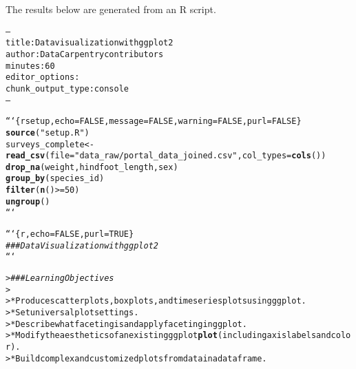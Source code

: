 \documentclass{article}\usepackage[]{graphicx}\usepackage[]{xcolor}
\makeatletter
\newcommand{\hlstr}[1]{\textcolor[rgb]{0.192,0.494,0.8}{#1}}%
\newcommand{\hlcom}[1]{\textcolor[rgb]{0.678,0.584,0.686}{\textit{#1}}}%
\newcommand{\hlkwd}[1]{\textcolor[rgb]{0.737,0.353,0.396}{\textbf{#1}}}%
\newenvironment{kframe}{%
 \def\at@end@of@kframe{}%
 \ifinner\ifhmode%
  \def\at@end@of@kframe{\end{minipage}}%
  \begin{minipage}{\columnwidth}%
 \fi\fi%
 \def\FrameCommand##1{\hskip\@totalleftmargin \hskip-\fboxsep
 \colorbox{shadecolor}{##1}\hskip-\fboxsep
     \hskip-\linewidth \hskip-\@totalleftmargin \hskip\columnwidth}%
 \MakeFramed {\advance\hsize-\width
   \@totalleftmargin\z@ \linewidth\hsize
   \@setminipage}}%
 {\par\unskip\endMakeFramed%
 \at@end@of@kframe}
\newenvironment{knitrout}{}{} %
\makeatother
\begin{document}
\title{\title{\title{\title{\title{}}}}}



\maketitle
The results below are generated from an R script.

\begin{knitrout}
\color{fgcolor}\begin{kframe}
\begin{alltt}
---
title: Data visualization with ggplot2
author: Data Carpentry contributors
minutes: 60
editor_options:
  chunk_output_type: console
---


```\{r setup, echo=FALSE, message = FALSE, warning = FALSE, purl=FALSE\}
\hlkwd{source}(\hlstr{"setup.R"})
surveys_complete <- \hlkwd{read_csv}(file = \hlstr{"data_raw/portal_data_joined.csv"}, col_types = \hlkwd{cols}()) %>%
  \hlkwd{drop_na}(weight, hindfoot_length, sex) %>%
  \hlkwd{group_by}(species_id) %>%
  \hlkwd{filter}(\hlkwd{n}() >= 50) %>%
  \hlkwd{ungroup}()
```

```\{r, echo=FALSE, purl=TRUE\}
\hlcom{### Data Visualization with ggplot2}
```
\end{alltt}


{\ttfamily\noindent\bfseries{}}\end{kframe}
\end{knitrout}
\begin{knitrout}
\color{fgcolor}\begin{kframe}
\begin{alltt}

> \hlcom{### Learning Objectives}
>
> * Produce scatter plots, boxplots, and time series plots using ggplot.
> * Set universal plot settings.
> * Describe what faceting is and apply faceting in ggplot.
> * Modify the aesthetics of an existing ggplot \hlkwd{plot} (including axis labels and color).
> * Build complex and customized plots from data in a data frame.
\end{alltt}


{\ttfamily\noindent\bfseries{}}\end{kframe}
\end{knitrout}
\end{document}
